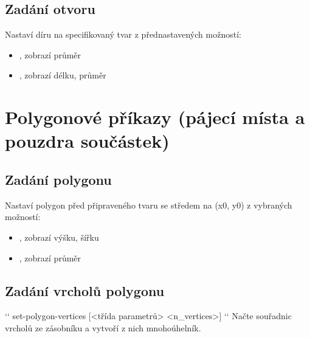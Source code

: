 \documentclass[letterpaper,10pt,czech]{sphinxmanual}
\begin{document}
\subsection{Zadání otvoru}
\label{\detokenize{parameter-programs:zadani-otvoru}}
 Nastaví díru na specifikovaný tvar z přednastavených možností:
\begin{itemize}
\item {} 
, zobrazí průměr

\item {} 
, zobrazí délku, průměr

\end{itemize}


\section{Polygonové příkazy (pájecí místa a pouzdra součástek)}
\label{\detokenize{parameter-programs:polygonove-prikazy-pajeci-mista-a-pouzdra-soucastek}}

\subsection{Zadání polygonu}
\label{\detokenize{parameter-programs:zadani-polygonu}}
 Nastaví polygon
před připraveného tvaru se středem na (x0, y0) z vybraných možností:
\begin{itemize}
\item {} 
, zobrazí výšku, šířku

\item {} 
, zobrazí průměr

\end{itemize}


\subsection{Zadání vrcholů polygonu}
\label{\detokenize{parameter-programs:zadani-vrcholu-polygonu}}
{}`{}` set-polygon-vertices {[}\textless{}třída parametrů\textgreater{} \textless{}n\_vertices\textgreater{}{]} {}`{}` Načte  souřadnic vrcholů ze zásobníku a vytvoří z nich mnohoúhelník.
\end{document}
